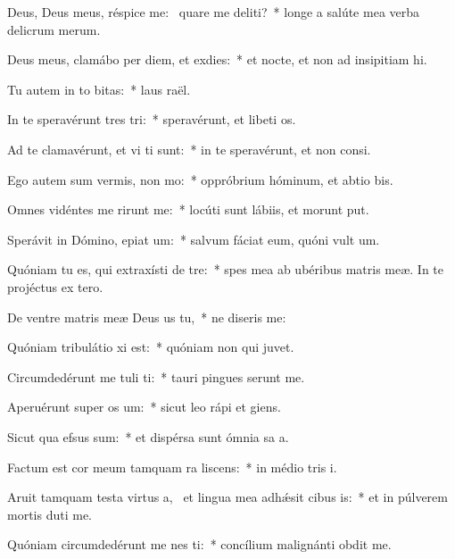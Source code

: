 \item Deus, Deus meus, réspice  me:~\pscross{} quare me deliti?~* longe a salúte mea verba delicrum merum.
\item Deus meus, clamábo per diem, et  exdies:~* et nocte, et non ad insipitiam hi.
\item Tu autem in to bitas:~* laus raël.
\item In te speravérunt tres tri:~* speravérunt, et libeti os.
\item Ad te clamavérunt, et vi ti sunt:~* in te speravérunt, et non  consi.
\item Ego autem sum vermis,  non mo:~* oppróbrium hóminum, et abtio bis.
\item Omnes vidéntes me rirunt me:~* locúti sunt lábiis, et morunt put.
\item Sperávit in Dómino, epiat um:~* salvum fáciat eum, quóni vult um.
\item Quóniam tu es, qui extraxísti  de tre:~* spes mea ab ubéribus matris meæ. In te projéctus  ex tero.
\item De ventre matris meæ Deus us  tu,~* ne diseris  me:
\item Quóniam tribulátio xi est:~* quóniam non  qui juvet.
\item Circumdedérunt me tuli ti:~* tauri pingues serunt me.
\item Aperuérunt super  os um:~* sicut leo rápi et giens.
\item Sicut qua efsus sum:~* et dispérsa sunt ómnia sa a.
\item Factum est cor meum tamquam ra liscens:~* in médio tris i.
\item Aruit tamquam testa virtus a,~\pscross{} et lingua mea adhǽsit cibus is:~* et in púlverem mortis duti me.
\item Quóniam circumdedérunt me nes ti:~* concílium malignánti obdit me.
